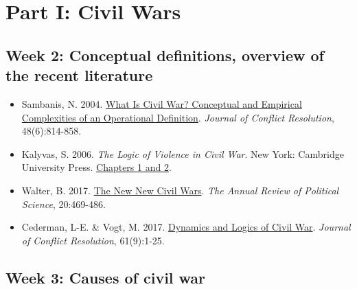 \documentclass[12pt,]{article}
\providecommand{\tightlist}{%
  \setlength{\itemsep}{0pt}\setlength{\parskip}{0pt}}
\begin{document}
\hypertarget{part-i-civil-wars}{%
\section{Part I: Civil Wars}\label{part-i-civil-wars}}

\hypertarget{week-2-conceptual-definitions-overview-of-the-recent-literature}{%
\subsection{Week 2: Conceptual definitions, overview of the recent
literature}\label{week-2-conceptual-definitions-overview-of-the-recent-literature}}

\begin{itemize}
\tightlist
\item
  Sambanis, N. 2004.
  \href{http://journals.sagepub.com/doi/abs/10.1177/0022002704269355}{What
  Is Civil War? Conceptual and Empirical Complexities of an Operational
  Definition}. \emph{Journal of Conflict Resolution}, 48(6):814-858.
\item
  Kalyvas, S. 2006. \emph{The Logic of Violence in Civil War}. New York:
  Cambridge University Press.
  \href{https://github.com/danilofreire/pols1824w/blob/master/readings/kalyvas2006chap1-2.pdf}{Chapters
  1 and 2}.
\item
  Walter, B. 2017.
  \href{https://www.annualreviews.org/doi/abs/10.1146/annurev-polisci-060415-093921}{The
  New New Civil Wars}. \emph{The Annual Review of Political Science},
  20:469-486.
\item
  Cederman, L-E. \& Vogt, M. 2017.
  \href{http://journals.sagepub.com/doi/abs/10.1177/0022002717721385}{Dynamics
  and Logics of Civil War}. \emph{Journal of Conflict Resolution},
  61(9):1-25.
\end{itemize}

\hypertarget{week-3-causes-of-civil-war}{%
\subsection{Week 3: Causes of civil
war}\label{week-3-causes-of-civil-war}}
\end{document}
